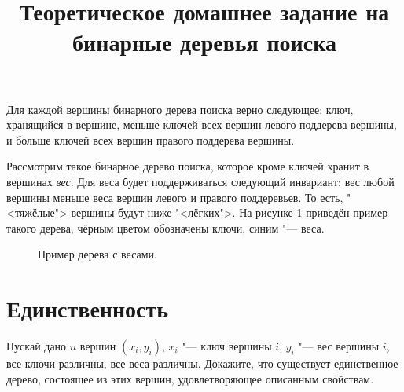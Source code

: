 \documentclass[12pt]{article}
\title{Теоретическое домашнее задание на бинарные деревья поиска}
\author{}
\date{\vspace{-5ex}}
\begin{document}
\usetikzlibrary{arrows.meta,positioning,matrix}

\maketitle

Для каждой вершины бинарного дерева поиска верно следующее: ключ, хранящийся в
вершине, меньше ключей всех вершин левого поддерева вершины, и больше ключей
всех вершин правого поддерева вершины.

Рассмотрим такое бинарное дерево поиска, которое кроме ключей хранит в вершинах
\emph{вес}. Для веса будет поддерживаться следующий инвариант: вес любой вершины
меньше веса вершин левого и правого поддеревьев. То есть, "<тяжёлые"> вершины
будут ниже "<лёгких">. На рисунке \ref{example} приведён пример такого дерева,
чёрным цветом обозначены ключи, синим "--- веса.

\begin{figure}[h]
  \centering
  \caption{Пример дерева с весами.}
  \label{example}
\end{figure}

\section{\texorpdfstring{Единственность}{Task 1}}
Пускай дано $n$ вершин $(x_i, y_i)$, $x_i$ "--- ключ вершины $i$, $y_i$ "--- вес
вершины $i$, все ключи различны, все веса различны.
Докажите, что существует единственное дерево, состоящее из этих вершин,
удовлетворяющее описанным свойствам.
\end{document}
